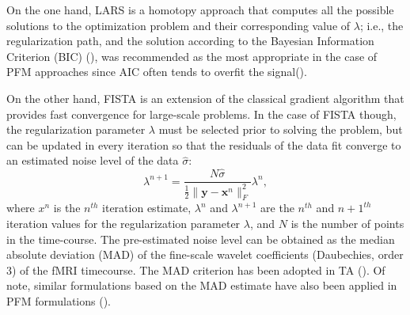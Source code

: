 On the one hand, LARS is a homotopy approach that computes all the possible solutions to the optimization problem and their corresponding value of $\lambda$; i.e., the regularization path, and the solution according to the Bayesian Information Criterion (BIC) (\citealt{Schwarz1978EstimatingDimensionModel}), was recommended as the most appropriate in the case of PFM approaches since AIC often tends to overfit the signal(\citealt{Gaudes2013Paradigmfreemapping,CaballeroGaudes2019deconvolutionalgorithmmulti}). 

On the other hand, FISTA is an extension of the classical gradient algorithm that provides fast convergence for large-scale problems. In the case of FISTA though, the regularization parameter $\lambda$ must be selected prior to solving the problem, but can be updated in every iteration so that the residuals of the data fit converge to an estimated noise level of the data $\hat{\sigma}$:
\begin{equation}
    \lambda^{n+1} = \frac{N \hat{\sigma}}{\frac{1}{2} \| \mathbf{y} - \mathbf{x}^n \|_F^2} \lambda^n,
\label{eq:std}
\end{equation}
where $x^n$ is the $n^{th}$ iteration estimate, $\lambda^n$ and $\lambda^{n+1}$ are the $n^{th}$ and $n+1^{th}$ iteration values for the regularization parameter $\lambda$, and $N$ is the number of points in the time-course. The pre-estimated noise level can be obtained as the median absolute deviation (MAD) of the fine-scale wavelet coefficients (Daubechies, order 3) of the fMRI timecourse. The MAD criterion has been adopted in TA (\citealt{Karahanoglu2013TotalactivationfMRI}). Of note, similar formulations based on the MAD estimate have also been applied in PFM formulations (\citealt{Gaudes2012Structuredsparsedeconvolution,Gaudes2011MorphologicalPFM}).

